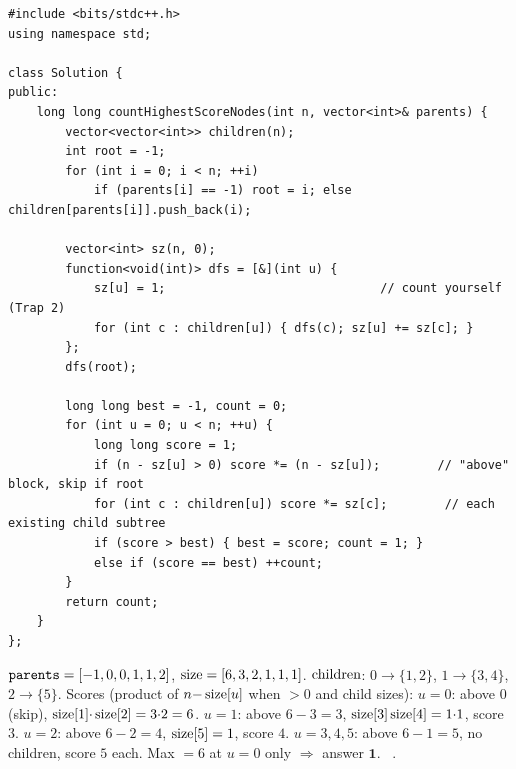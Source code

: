 \begin{lstlisting}[caption={Count Nodes With the Highest Score (LeetCode 2049)}, label={lst:c04-highest-score}]
#include <bits/stdc++.h>
using namespace std;

class Solution {
public:
    long long countHighestScoreNodes(int n, vector<int>& parents) {
        vector<vector<int>> children(n);
        int root = -1;
        for (int i = 0; i < n; ++i)
            if (parents[i] == -1) root = i; else children[parents[i]].push_back(i);

        vector<int> sz(n, 0);
        function<void(int)> dfs = [&](int u) {
            sz[u] = 1;                              // count yourself (Trap 2)
            for (int c : children[u]) { dfs(c); sz[u] += sz[c]; }
        };
        dfs(root);

        long long best = -1, count = 0;
        for (int u = 0; u < n; ++u) {
            long long score = 1;
            if (n - sz[u] > 0) score *= (n - sz[u]);        // "above" block, skip if root
            for (int c : children[u]) score *= sz[c];        // each existing child subtree
            if (score > best) { best = score; count = 1; }
            else if (score == best) ++count;
        }
        return count;
    }
};
\end{lstlisting}

\begin{tracebox}[$R$ re-indexed $0..5$]
$\texttt{parents}=[-1,0,0,1,1,2]$, $\operatorname{size}=[6,3,2,1,1,1]$.
$\operatorname{children}$: $0\!\to\!\{1,2\}$, $1\!\to\!\{3,4\}$, $2\!\to\!\{5\}$. Scores (product of
$n{-}\operatorname{size}[u]$ when $>0$ and child sizes):
$u{=}0$: above $0$ (skip), $\operatorname{size}[1]{\cdot}\operatorname{size}[2]=3{\cdot}2=6$.
$u{=}1$: above $6{-}3{=}3$, $\operatorname{size}[3]\operatorname{size}[4]=1{\cdot}1$, score $3$.
$u{=}2$: above $6{-}2{=}4$, $\operatorname{size}[5]=1$, score $4$.
$u{=}3,4,5$: above $6{-}1{=}5$, no children, score $5$ each.
Max $=6$ at $u=0$ only $\Rightarrow$ answer $\mathbf{1}$. \checkmark\ .
\end{tracebox}


